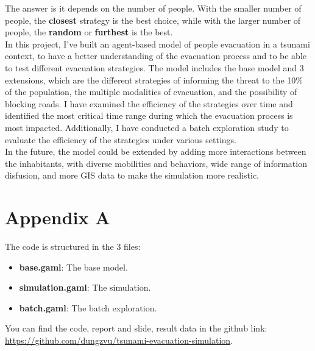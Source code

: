 \documentclass[12pt]{article}
\begin{document}
The answer is it depends on the number of people. With the smaller number of people, the \textbf{closest} strategy is the best choice, while with the larger number of people, the \textbf{random} or \textbf{furthest} is the best. \\

In this project, I've built an agent-based model of people evacuation in a tsunami context, to have a better understanding of the evacuation process and to be able to test different evacuation strategies. The model includes the base model and 3 extensions, which are the different strategies of informing the threat to the 10\% of the population, the multiple modalities of evacuation, and the possibility of blocking roads. I have examined the efficiency of the strategies over time and identified the most critical time range during which the evacuation process is most impacted. Additionally, I have conducted a batch exploration study to evaluate the efficiency of the strategies under various settings.\\

In the future, the model could be extended by adding more interactions between the inhabitants, with diverse mobilities and behaviors, wide range of information disfusion, and more GIS data to make the simulation more realistic.


\section*{Appendix A}

The code is structured in the 3 files:
\begin{itemize}
    \item \textbf{base.gaml}: The base model.
    \item \textbf{simulation.gaml}: The simulation.
    \item \textbf{batch.gaml}: The batch exploration.
\end{itemize}

You can find the code, report and slide, result data in the github link: \url{https://github.com/dungzvu/tsunami-evacuation-simulation}.
\end{document}
